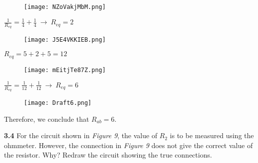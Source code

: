 \documentclass{article}
\begin{document}
{\vspace{8mm}}

\begin{figure}[H]
    \centering
    \texttt{[image: NZoVakjMbM.png]}
\end{figure}

\begin{center}
{\Large $\displaystyle \frac1{R_{eq}} = \frac{1}{4} + \frac{1}{4} \ \rightarrow \ R_{eq} = 2$}
\end{center}

{\vspace{8mm}}

\begin{figure}[H]
    \centering
    \texttt{[image: J5E4VKKIEB.png]}
\end{figure}

\begin{center}
{\Large $\displaystyle R_{eq} = 5 + 2 + 5 = 12$}
\end{center}

{\vspace{8mm}}

\begin{figure}[H]
    \centering
    \texttt{[image: mEitjTe87Z.png]}
\end{figure}

\begin{center}
{\Large $\displaystyle \frac1{R_{eq}} = \frac{1}{12} + \frac{1}{12} \ \rightarrow \ R_{eq} = 6$}
\end{center}

{\vspace{8mm}}

\begin{figure}[H]
    \centering
    \texttt{[image: Draft6.png]}
\end{figure}

{\vspace{4mm}}

{\Large Therefore, we conclude that $\boxed{R_{ab} = 6}$.}

{\vspace{8mm}}

\newpage

{\Large \textbf{3.4} For the circuit shown in \textit{Figure 9}, the value of $R_{2}$ is to be measured using the ohmmeter. However, the connection in \textit{Figure 9} does not give the correct value of the resistor. Why? Redraw the circuit showing the true connections.}
\end{document}

